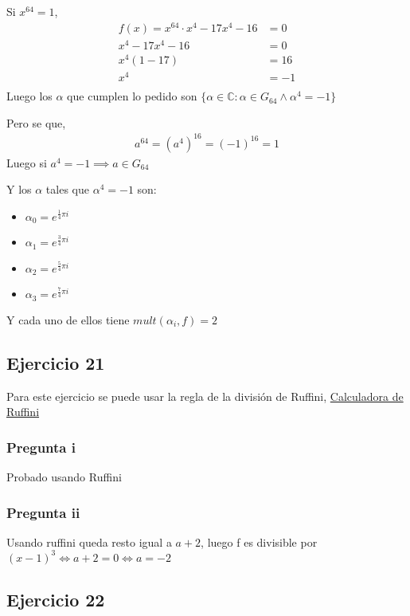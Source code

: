 Si $x^{64} = 1$,
\begin{align*}
    f(x) = x^{64} \cdot x^4 - 17x^4 - 16 &= 0 \\
    x^4 - 17x^4 - 16 &= 0 \\
    x^4(1-17) &= 16 \\
    x^4 &= -1 \\
\end{align*}
Luego los $\alpha$ que cumplen lo pedido son $ \{\alpha \in \mathbb{C}: \alpha \in G_{64} \wedge \alpha^4=-1 \} $

Pero se que,
\begin{align*}
    a^{64} = (a^{4})^{16} = (-1)^{16} = 1
\end{align*}
Luego si $ a^{4} = -1 \implies a \in G_{64} $

Y los $ \alpha $ tales que $ \alpha^4 = -1 $ son:
\begin{itemize}
    \item $ \alpha_0 = e^{\frac{1}{4}\pi i} $
    \item $ \alpha_1 = e^{\frac{3}{4}\pi i} $
    \item $ \alpha_2 = e^{\frac{5}{4}\pi i} $
    \item $ \alpha_3 = e^{\frac{7}{4}\pi i} $
\end{itemize}
Y cada uno de ellos tiene $ mult(\alpha_i, f) = 2$

\subsection{Ejercicio 21}

Para este ejercicio se puede usar la regla de la división de Ruffini, 
\href{https://calculadorasonline.com/calculadora-de-division-sintetica-regla-de-ruffini-online/}{Calculadora de Ruffini}
\subsubsection{Pregunta i}
Probado usando Ruffini

\subsubsection{Pregunta ii}
Usando ruffini queda resto igual a $ a+2 $, luego f es divisible por $(x-1)^3 \iff a+2 = 0 \iff a = -2$

\subsection{Ejercicio 22}

